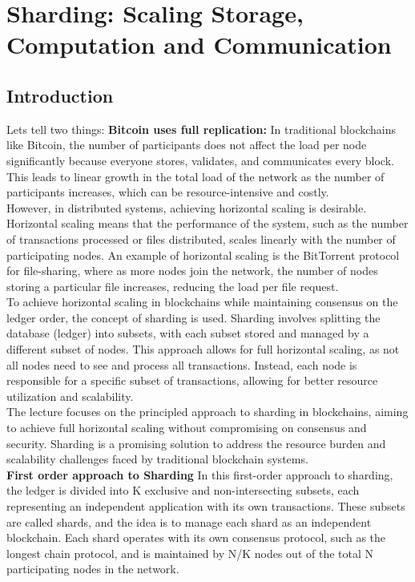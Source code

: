 \chapter{Sharding: Scaling Storage, Computation and Communication}

\section{Introduction}
Lets tell two things:
\textbf{Bitcoin uses full replication:} In traditional blockchains like Bitcoin, the number of participants does not affect the load per node significantly because everyone stores, validates, and communicates every block. This leads to linear growth in the total load of the network as the number of participants increases, which can be resource-intensive and costly.\\
However, in distributed systems, achieving horizontal scaling is desirable. Horizontal scaling means that the performance of the system, such as the number of transactions processed or files distributed, scales linearly with the number of participating nodes. An example of horizontal scaling is the BitTorrent protocol for file-sharing, where as more nodes join the network, the number of nodes storing a particular file increases, reducing the load per file request.\\
To achieve horizontal scaling in blockchains while maintaining consensus on the ledger order, the concept of sharding is used. Sharding involves splitting the database (ledger) into subsets, with each subset stored and managed by a different subset of nodes. This approach allows for full horizontal scaling, as not all nodes need to see and process all transactions. Instead, each node is responsible for a specific subset of transactions, allowing for better resource utilization and scalability.\\
The lecture focuses on the principled approach to sharding in blockchains, aiming to achieve full horizontal scaling without compromising on consensus and security. Sharding is a promising solution to address the resource burden and scalability challenges faced by traditional blockchain systems.\\
\textbf{First order approach to Sharding} In this first-order approach to sharding, the ledger is divided into K exclusive and non-intersecting subsets, each representing an independent application with its own transactions. These subsets are called shards, and the idea is to manage each shard as an independent blockchain. Each shard operates with its own consensus protocol, such as the longest chain protocol, and is maintained by N/K nodes out of the total N participating nodes in the network.\\

